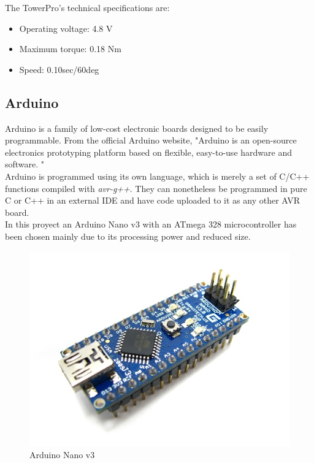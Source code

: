 	The TowerPro's technical specifications are:
			\begin{itemize}
				\item Operating voltage: 4.8 V
				\item Maximum torque: 0.18 Nm
				\item Speed: 0.10sec/60deg
			\end{itemize}	














\newpage
\subsection{Arduino}

	Arduino is a family of low-cost electronic boards designed to be easily programmable. From the official Arduino website, "Arduino is an open-source electronics prototyping platform based on flexible, easy-to-use hardware and software. "\\

	Arduino is programmed using its own language, which is merely a set of C/C++ functions compiled with \textit{avr-g++}. They can nonetheless be programmed in pure C or C++ in an external IDE and have code uploaded to it as any other AVR board.\\

	In this proyect an Arduino Nano v3 with an ATmega 328 microcontroller has been chosen mainly due to its processing power and reduced size.
		
		\begin{figure}[H]
			\centering
			\includegraphics[scale=0.4]{images/ProjectComponents/arduino.jpg}
			\caption{Arduino Nano v3 }
			\label{}
		\end{figure}
		\bigskip

